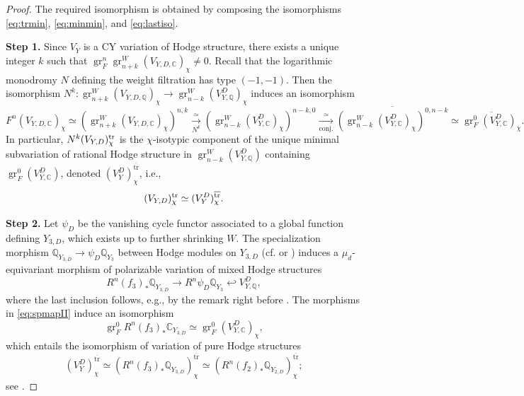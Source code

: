 \documentclass{amsart}
\newcommand{\trcon}{\mathrm{\overline{tr}}}
\theoremstyle{definition}
\theoremstyle{remark}
\def\bQ{\mathbb{Q}}
\def\bC{\mathbb{C}}
\def\gr{\operatorname{gr}}
\numberwithin{equation}{section}
\begin{document}
\begin{proof} The required isomorphism is obtained by composing the isomorphisms \eqref{eq:trmin}, \eqref{eq:minmin}, and \eqref{eq:lastiso}.

\textbf{Step 1.}
Since $V_Y$ is a CY variation of Hodge structure, there exists a unique integer $k$ such that $\gr^n_F \gr^W_{n+k} (V_{Y, D, \bC})_{\chi} \neq 0$. Recall that the logarithmic monodromy $N$ defining the weight filtration has type $(-1, -1)$.
Then the isomorphism $N^{k} \colon \gr^W_{n+k} (V_{Y, D, \bQ})_{\chi} \to \gr^W_{n-k} (V_{Y, \bQ}^D)_{\chi}$  induces an isomorphism
\[F^{n}(V_{Y,D,\bC})_{\chi} \simeq (\gr^W_{n+k} (V_{Y,D,\bC})_{\chi})^{n, k} \xrightarrow[N^{k}]{\simeq}  (\gr^W_{n-k} (V_{Y,\bC}^D)_{\chi})^{n-k,0} \xrightarrow[\mathrm{conj}.]{\simeq} \overline{(\gr^W_{n-k} (V_{Y,\bC}^D)_{\chi})^{0, n-k}} \simeq \overline{\gr^{0}_F(V_{Y,\bC}^D)_{\chi}}.\]
In particular, $N^{k}(V_{Y,D})^{\rm tr}_{\chi}$ is the $\chi$-isotypic component of the unique minimal subvariation of rational Hodge structure in $\gr^W_{n-k} (V^D_{Y, \bQ})$ containing
$\gr^0_F (V_{Y, \bC}^D)$, denoted $(V_{Y}^D)^{\trcon}_{\chi}$, i.e., 
\begin{equation}\label{eq:trmin} 
(V_{Y,D})^{\rm tr}_{\chi} \simeq (V_Y^D)^{\trcon}_{\chi}.
\end{equation}

\textbf{Step 2.} Let $\psi_D$ be the vanishing cycle functor associated to a global function defining $Y_{3, D}$, which exists up to further shrinking $W$. 
The specialization morphism 
$\bQ_{Y_{3, D}}
\to
\psi_D \bQ_{Y_3}$
between Hodge modules on $Y_{3, D}$ (cf. \cite[(2.24.3)]{SaitoMHM} or \cite[Thm.~11.29]{peterssteenbrink})
induces a $\mu_d$-equivariant morphism of polarizable variation of mixed Hodge structures
\begin{equation}\label{eq:spmapII}
R^n (f_3)_* \bQ_{Y_{3, D}}
\to
R^n \psi_D \bQ_{Y_3} \hookleftarrow  V^D_{Y, \bQ},
\end{equation}
where the last inclusion follows, e.g., by the remark right before \cite[(5.11) Cor.]{steenbrinklimit}.
The morphisms in \eqref{eq:spmapII} induce an isomorphism \[\gr^0_F R^n (f_3)_* \bC_{Y_{3, D}} \simeq \gr^0_F (V_{Y, \bC}^D)_{\chi},\] which entails the isomorphism of variation of pure Hodge structures
\begin{equation}\label{eq:minmin}
(V_{Y}^{D})^{\trcon} _{\chi}\simeq (R^n (f_3)_* \bQ_{Y_{3, D}})^{\trcon}_{\chi} \simeq (R^n (f_2)_* \bQ_{Y_{2, D}})^{\trcon}_{\chi};
\end{equation}
see \cite[Cor. 5.7, Proof of Prop.~9.2]{KLS2021}. 


\end{proof}
\end{document}
